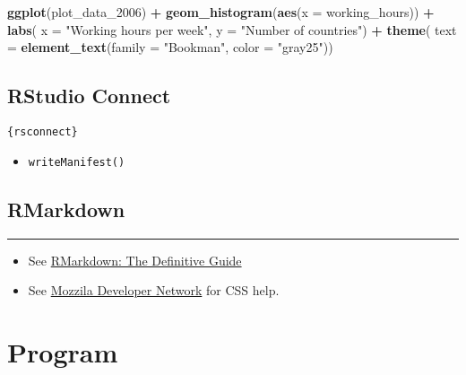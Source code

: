 \documentclass[
]{book}
\newenvironment{Shaded}{\begin{snugshade}}{\end{snugshade}}
\newcommand{\DataTypeTok}[1]{\textcolor[rgb]{0.13,0.29,0.53}{#1}}
\newcommand{\DecValTok}[1]{\textcolor[rgb]{0.00,0.00,0.81}{#1}}
\newcommand{\KeywordTok}[1]{\textcolor[rgb]{0.13,0.29,0.53}{\textbf{#1}}}
\newcommand{\NormalTok}[1]{#1}
\newcommand{\OperatorTok}[1]{\textcolor[rgb]{0.81,0.36,0.00}{\textbf{#1}}}
\newcommand{\StringTok}[1]{\textcolor[rgb]{0.31,0.60,0.02}{#1}}
\providecommand{\tightlist}{%
  \setlength{\itemsep}{0pt}\setlength{\parskip}{0pt}}
\begin{document}
\begin{Shaded}
\begin{Highlighting}[]
\KeywordTok{ggplot}\NormalTok{(plot_data_}\DecValTok{2006}\NormalTok{) }\OperatorTok{+}
\StringTok{  }\KeywordTok{geom_histogram}\NormalTok{(}\KeywordTok{aes}\NormalTok{(}\DataTypeTok{x =}\NormalTok{ working_hours)) }\OperatorTok{+}
\StringTok{  }\KeywordTok{labs}\NormalTok{(}
    \DataTypeTok{x =} \StringTok{"Working hours per week"}\NormalTok{,}
    \DataTypeTok{y =} \StringTok{"Number of countries"}\NormalTok{) }\OperatorTok{+}
\StringTok{  }\KeywordTok{theme}\NormalTok{(}
    \DataTypeTok{text =} \KeywordTok{element_text}\NormalTok{(}\DataTypeTok{family =} \StringTok{"Bookman"}\NormalTok{, }\DataTypeTok{color =} \StringTok{"gray25"}\NormalTok{))}
\end{Highlighting}
\end{Shaded}

\hypertarget{rstudio-connect}{%
\section{RStudio Connect}\label{rstudio-connect}}

\texttt{\{rsconnect\}}

\begin{itemize}
\tightlist
\item
  \texttt{writeManifest()}
\end{itemize}

\hypertarget{rmarkdown}{%
\section{RMarkdown}\label{rmarkdown}}

\begin{center}\rule{0.5\linewidth}{0.5pt}\end{center}

\begin{itemize}
\tightlist
\item
  See \href{https://bookdown.org/yihui/rmarkdown/}{RMarkdown: The Definitive Guide}
\item
  See \href{https://developer.mozilla.org/en-US/docs/Web/CSS/CSS_Selectors}{Mozzila Developer Network} for CSS help.
\end{itemize}

\hypertarget{program}{%
\chapter{Program}\label{program}}
\end{document}
